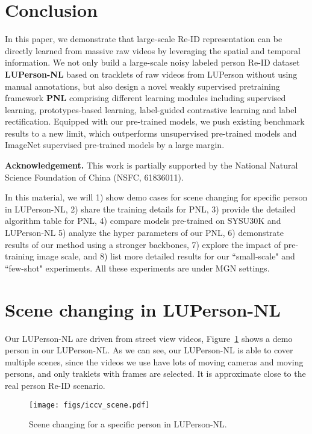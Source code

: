 \documentclass[10pt,twocolumn,letterpaper]{article}
\begin{document}
\section{Conclusion}
In this paper, we demonstrate that large-scale Re-ID representation can be directly learned from massive raw videos by leveraging the spatial and temporal information. We not only build a large-scale noisy labeled person Re-ID dataset \textbf{LUPerson-NL} based on tracklets of raw videos from LUPerson without using manual annotations, but also design a novel weakly supervised pretraining framework \textbf{PNL} comprising different learning modules including supervised learning, prototypes-based learning, label-guided contrastive learning and label rectification. Equipped with our pre-trained models, we push existing benchmark results to a new limit, which outperforms unsupervised pre-trained models and ImageNet supervised pre-trained models by a large margin. 


\noindent \textbf{Acknowledgement.} This work is partially supported by the National Natural Science Foundation of China (NSFC, 61836011).

{\small


}

\clearpage
\newpage
\appendix
In this material, we will 1) show demo cases for scene changing for specific person in LUPerson-NL, 2) share the training details for PNL, 3) provide the detailed algorithm table for PNL, 4) compare models pre-trained on SYSU30K and LUPerson-NL 5) analyze the hyper parameters of our PNL, 6) demonstrate results of our method using a stronger backbones, 7) explore the impact of pre-training image scale, and 8) list more detailed results for our ``small-scale" and ``few-shot" experiments. All these experiments are under MGN settings.

\section{Scene changing in LUPerson-NL}
Our LUPerson-NL are driven from street view videos, Figure~\ref{fig:scene-change} shows a demo person in our LUPerson-NL. As we can see, our LUPerson-NL is able to cover multiple scenes, since the videos we use have lots of moving cameras and moving persons, and only traklets with  frames are selected. It is approximate close to the real person Re-ID scenario.

\begin{figure}[ht]
	\begin{center}
		\texttt{[image: figs/iccv\_scene.pdf]}
	\end{center}
	\caption{Scene changing for a specific person in LUPerson-NL.}
	\label{fig:scene-change}
\end{figure}
\end{document}
